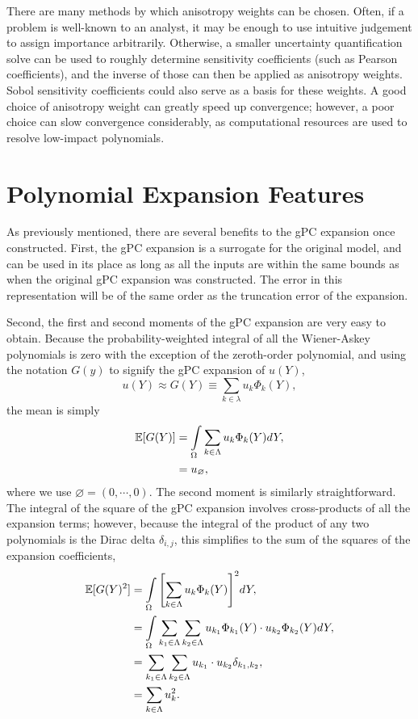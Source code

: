 There are many methods by which anisotropy weights can be chosen.  Often, if a problem is well-known to an 
analyst, it may be enough to use intuitive judgement to assign importance arbitrarily.  Otherwise, a smaller
uncertainty quantification solve can be used to roughly determine sensitivity coefficients (such as Pearson
coefficients), and the inverse of those can then be applied as anisotropy weights.  Sobol sensitivity coefficients
\cite{gfunc} could also serve as a basis for these weights.
A good choice of anisotropy weight can greatly speed up convergence; however, a
poor choice can slow convergence considerably, as computational resources are used to resolve low-impact
polynomials.


\section{Polynomial Expansion Features}
As previously mentioned, there are several benefits to the gPC expansion once constructed.  First, the gPC
expansion is a
surrogate for the original model, and can be used in its place as long as all the inputs are within
the same bounds as when the original gPC expansion was constructed.  The error in this representation will be of the
same order as the truncation error of the expansion.

Second, the first and second moments of the gPC expansion are very easy to obtain.  Because the probability-weighted 
integral of all the Wiener-Askey polynomials is zero with the exception of the zeroth-order polynomial, and
using the notation $G(y)$ to signify the gPC expansion of $u(Y)$, 
\begin{equation}
  u(Y) \approx G(Y) \equiv \sum_{k\in\lambda} u_k\Phi_k(Y),
\end{equation}
the mean is simply
\begin{align}
  \mathbb{E}[ G(Y)]  &= \int\limits_\Omega \sum_{k\in\Lambda} u_k\Phi_k(Y) dY, \nonumber\\
                      &= u_\varnothing,
\end{align}
where we use $\varnothing = (0,\cdots,0)$.
The second moment is similarly straightforward.  The integral of the square of the gPC expansion involves cross-products of
all the expansion terms; however, because the integral of the product of any two polynomials is the Dirac
delta $\delta_{i,j}$, this simplifies to the sum of the squares of the expansion coefficients,
\begin{align}
  \expv{G(Y)^2} &=\int\limits_\Omega \qty[\sum_{k\in\Lambda} u_k\Phi_k(Y)]^2 dY,
                 \nonumber\\ \vspace{5pt}
  &= \int\limits_\Omega \sum_{k_1\in\Lambda} \sum_{k_2\in\Lambda} u_{k_1}\Phi_{k_1}(Y) \cdot 
                           u_{k_2}\Phi_{k_2}(Y) dY, \nonumber \\ \vspace{5pt}
  &= \sum_{k_1\in\Lambda} \sum_{k_2\in\Lambda} u_{k_1} \cdot u_{k_2}\delta_{k_1,k_2},\nonumber \\ \vspace{5pt}
  &= \sum_{k\in\Lambda} u_k^2.
\end{align}

